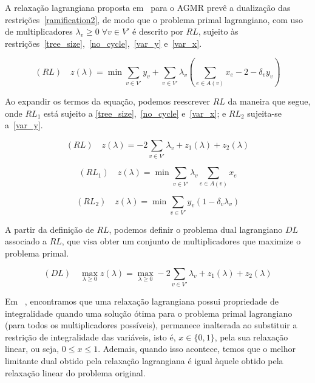 \documentclass[12pt, a4paper]{article}
\theoremstyle{plain}
\theoremstyle{definition}
\theoremstyle{remark}
\begin{document}
A relaxação lagrangiana proposta em~\cite{Carrabs2013} para o AGMR prevê a dualização das restrições~\eqref{ramification2}, de modo que o problema primal lagrangiano, com uso de multiplicadores $\lambda_v \geq 0 \; \forall v \in V'$ é descrito por $RL$, sujeito às restrições~\eqref{tree_size},~\eqref{no_cycle},~\eqref{var_y} e~\eqref{var_x}.

\begin{equation} \label{rl_original}
	(RL) \quad z(\lambda) = \min \sum_{v \in V'}y_v + \sum_{v \in V'}\lambda_v \left(\sum_{e \in A(v)}x_e -2 -\delta_v y_v \right) 
\end{equation}

Ao expandir os termos da equação, podemos reescrever $RL$ da maneira que segue, onde $RL_1$ está sujeito a \eqref{tree_size},~\eqref{no_cycle} e~\eqref{var_x}; e $RL_2$ sujeita-se a~\eqref{var_y}.

\begin{equation} \label{rl_mod}
	(RL) \quad z(\lambda) = -2 \sum_{v \in V'}\lambda_v + z_1(\lambda) + z_2(\lambda)
\end{equation}

\begin{equation} \label{rl_1}
	(RL_1) \quad z(\lambda) = \min \sum_{v \in V'}\lambda_v \sum_{e \in A(v)}x_e
\end{equation}

\begin{equation} \label{rl_2}
	(RL_2) \quad z(\lambda) = \min \sum_{v \in V'} y_v(1 - \delta_v \lambda_v)
\end{equation}

A partir da definição de $RL$, podemos definir o problema dual lagrangiano $DL$ associado a $RL$, que visa obter um conjunto de multiplicadores que maximize o problema primal.

\begin{equation} \label{dl}
	(DL) \quad \max_{\lambda \geq 0} z(\lambda) = \max_{\lambda \geq 0} -2 \sum_{v \in V'}\lambda_v + z_1(\lambda) + z_2(\lambda)
\end{equation}

Em ~\cite{Beasley1993}, encontramos que uma relaxação lagrangiana possui propriedade de integralidade quando uma solução ótima para o problema primal lagrangiano (para todos os multiplicadores possíveis), permanece inalterada ao substituir a restrição de integralidade das variáveis, isto é, $x\in\{0,1\}$, pela sua relaxação linear, ou seja, $0 \leq x \leq 1$. Ademais, quando isso acontece, temos que o melhor limitante dual obtido pela relaxação lagrangiana é igual àquele obtido pela relaxação linear do problema original.
\end{document}
